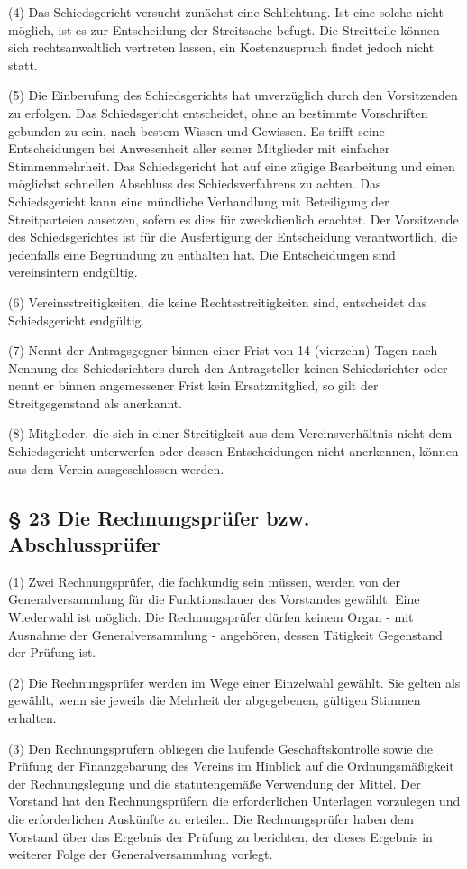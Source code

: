\documentclass[11pt,a4paper]{article}
\begin{document}
(4)
Das Schiedsgericht versucht zunächst eine Schlichtung.
Ist eine solche nicht möglich, ist es zur Entscheidung der Streitsache befugt.
Die Streitteile können sich rechtsanwaltlich vertreten lassen, ein Kostenzuspruch findet jedoch nicht statt.

(5)
Die Einberufung des Schiedsgerichts hat unverzüglich durch den Vorsitzenden zu erfolgen.
Das Schiedsgericht entscheidet, ohne an bestimmte Vorschriften gebunden zu sein, nach bestem Wissen und Gewissen.
Es trifft seine Entscheidungen bei Anwesenheit aller seiner Mitglieder mit einfacher Stimmenmehrheit.
Das Schiedsgericht hat auf eine zügige Bearbeitung und einen möglichst schnellen Abschluss des Schiedsverfahrens zu achten.
Das Schiedsgericht kann eine mündliche Verhandlung mit Beteiligung der Streitparteien ansetzen, sofern es dies für zweckdienlich erachtet.
Der Vorsitzende des Schiedsgerichtes ist für die Ausfertigung der Entscheidung verantwortlich, die jedenfalls eine Begründung zu enthalten hat.
Die Entscheidungen sind vereinsintern endgültig.

(6)
Vereinsstreitigkeiten, die keine Rechtsstreitigkeiten sind, entscheidet das Schiedsgericht endgültig.

(7)
Nennt der Antragsgegner binnen einer Frist von 14 (vierzehn) Tagen nach Nennung des Schiedsrichters durch den Antragsteller keinen Schiedsrichter oder nennt er binnen angemessener Frist kein Ersatzmitglied, so gilt der Streitgegenstand als anerkannt.

(8)
Mitglieder, die sich in einer Streitigkeit aus dem Vereinsverhältnis nicht dem Schiedsgericht unterwerfen oder dessen Entscheidungen nicht anerkennen, können aus dem Verein ausgeschlossen werden.

\subsection{§ 23
Die Rechnungsprüfer bzw. Abschlussprüfer}

(1)
Zwei Rechnungsprüfer, die fachkundig sein müssen, werden von der Generalversammlung für die Funktionsdauer des Vorstandes gewählt.
Eine Wiederwahl ist möglich.
Die Rechnungsprüfer dürfen keinem Organ - mit Ausnahme der Generalversammlung - angehören, dessen Tätigkeit Gegenstand der Prüfung ist.

(2)
Die Rechnungsprüfer werden im Wege einer Einzelwahl gewählt.
Sie gelten als gewählt, wenn sie jeweils die Mehrheit der abgegebenen, gültigen Stimmen erhalten.

(3)
Den Rechnungsprüfern obliegen die laufende Geschäftskontrolle sowie die Prüfung der Finanzgebarung des Vereins im Hinblick auf die Ordnungsmäßigkeit der Rechnungslegung und die statutengemäße Verwendung der Mittel.
Der Vorstand hat den Rechnungsprüfern die erforderlichen Unterlagen vorzulegen und die erforderlichen Auskünfte zu erteilen.
Die Rechnungsprüfer haben dem Vorstand über das Ergebnis der Prüfung zu berichten, der dieses Ergebnis in weiterer Folge der Generalversammlung vorlegt.
\end{document}

